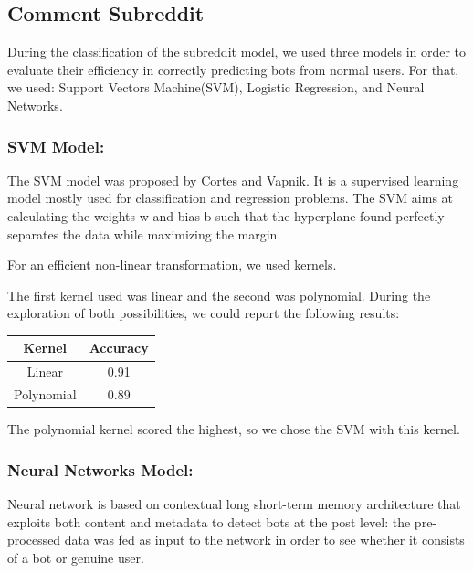 \documentclass{article}
\begin{document}
    \subsection{Comment Subreddit}
    During the classification of  the subreddit model, we used three models in order to evaluate their efficiency in correctly predicting bots from normal users. For that, we used: Support Vectors Machine(SVM), Logistic Regression, and Neural Networks.
    
    \subsubsection{SVM Model:}
    
    The SVM model was proposed by Cortes and Vapnik. It is a supervised learning model mostly used for classification and regression problems. The SVM aims at calculating the weights w and bias b such that the hyperplane found perfectly separates the data while maximizing the margin.
    
    For an efficient non-linear transformation, we used kernels.
    
    The first kernel used was linear and the second was polynomial. During the exploration of both possibilities, we could report the following results:
    
    \begin{center}
    \begin{tabular}{||c c||} 
     \hline
     Kernel & Accuracy    \\ [0.5ex] 
     \hline\hline
     Linear & 0.91  \\ 
     \hline
     Polynomial & 0.89  \\
     \hline
    \end{tabular}
    \end{center}
    
    The polynomial kernel scored the highest, so we chose the SVM with this kernel.
       

    \subsubsection{Neural Networks Model:}
    
    Neural network is based on contextual long short-term memory architecture that exploits both content and metadata to detect bots at the post level: the pre-processed data was fed as  input to the network in order to see whether it consists of a bot or genuine user. 
    
\end{document}
